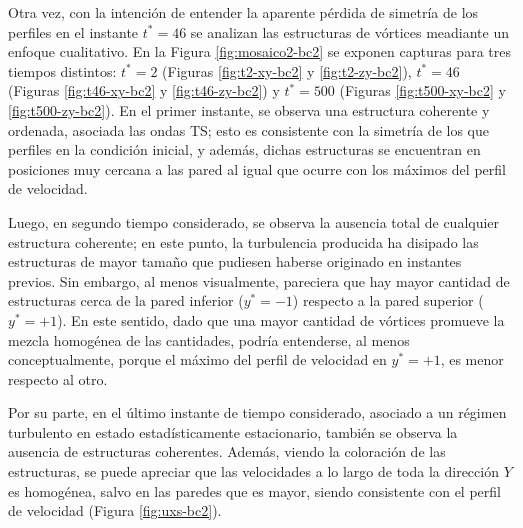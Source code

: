 Otra vez, con la intención de entender la aparente pérdida de simetría de los perfiles en el instante $t^* = 46$ se analizan las estructuras de vórtices meadiante un enfoque cualitativo. En la Figura \ref{fig:mosaico2-bc2} se exponen capturas para tres tiempos distintos: $t^* = 2$ (Figuras \ref{fig:t2-xy-bc2} y  \ref{fig:t2-zy-bc2}),  $t^* = 46$  (Figuras \ref{fig:t46-xy-bc2} y \ref{fig:t46-zy-bc2}) y  $t^* = 500$  (Figuras \ref{fig:t500-xy-bc2} y \ref{fig:t500-zy-bc2}). En el primer instante, se observa una estructura coherente y ordenada, asociada las ondas TS; esto es consistente con la simetría de los que perfiles en la condición inicial, y además, dichas estructuras se encuentran en posiciones muy cercana a las pared al igual que ocurre con los máximos del perfil de velocidad. 

Luego, en segundo tiempo considerado, se observa la ausencia total de cualquier estructura coherente; en este punto, la turbulencia producida ha disipado las estructuras de mayor tamaño que pudiesen haberse originado en instantes previos. Sin embargo, al menos visualmente, pareciera que hay mayor cantidad de estructuras cerca de la pared inferior ($y^*=-1$) respecto a la pared superior ($y^*=+1$). En este sentido, dado que una mayor cantidad de vórtices promueve la mezcla homogénea de las cantidades, podría entenderse, al menos conceptualmente, porque el máximo del perfil de velocidad en $y^*=+1$, es menor respecto al otro.   

Por su parte, en el último instante de tiempo considerado, asociado a un régimen turbulento en estado estadísticamente estacionario, también se observa la ausencia de estructuras coherentes. Además, viendo la coloración de las estructuras, se puede apreciar que las velocidades a lo largo de toda la dirección $Y$ es homogénea, salvo en las paredes que es mayor, siendo consistente con el perfil de velocidad (Figura \ref{fig:uxs-bc2}).

